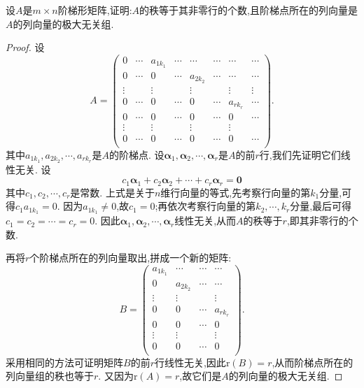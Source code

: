 \documentclass[../../main.tex]{subfiles}%
\begin{document}
\begin{proposition}\label{proposition:阶梯形矩阵的非零行对应其列向量的极大无关组}
设\(A\)是\(m\times n\)阶梯形矩阵,证明:\(A\)的秩等于其非零行的个数,且阶梯点所在的列向量是\(A\)的列向量的极大无关组.
\end{proposition}
\begin{proof}

设
\[
A=\left( \begin{matrix}
0&		\cdots&		a_{1k_1}&		\cdots&		\cdots&		\cdots&		\cdots&		\cdots\\
0&		\cdots&		0&		\cdots&		a_{2k_2}&		\cdots&		\cdots&		\cdots\\
\vdots&		&		\vdots&		&		\vdots&		&		\vdots&		\vdots\\
0&		\cdots&		0&		\cdots&		0&		\cdots&		a_{rk_r}&		\cdots\\
0&		\cdots&		0&		\cdots&		0&		\cdots&		0&		\cdots\\
\vdots&		&		\vdots&		&		\vdots&		&		\vdots&		\\
0&		\cdots&		0&		\cdots&		0&		\cdots&		0&		\cdots\\
\end{matrix} \right) .
\]
其中\(a_{1k_1},a_{2k_2},\cdots,a_{rk_r}\)是\(A\)的阶梯点. 设\(\boldsymbol{\alpha}_1,\boldsymbol{\alpha}_2,\cdots,\boldsymbol{\alpha}_r\)是\(A\)的前\(r\)行,我们先证明它们线性无关. 设
\[
c_1\boldsymbol{\alpha}_1 + c_2\boldsymbol{\alpha}_2+\cdots + c_r\boldsymbol{\alpha}_r=\boldsymbol{0}
\]
其中\(c_1,c_2,\cdots,c_r\)是常数. 上式是关于\(n\)维行向量的等式,先考察行向量的第\(k_1\)分量,可得\(c_1a_{1k_1}=0\). 因为\(a_{1k_1}\neq0\),故\(c_1 = 0\);再依次考察行向量的第\(k_2,\cdots,k_r\)分量,最后可得\(c_1 = c_2=\cdots = c_r = 0\). 因此\(\boldsymbol{\alpha}_1,\boldsymbol{\alpha}_2,\cdots,\boldsymbol{\alpha}_r\)线性无关,从而\(A\)的秩等于\(r\),即其非零行的个数.

再将\(r\)个阶梯点所在的列向量取出,拼成一个新的矩阵:
\[
B=\left( \begin{matrix}
a_{1k_1}&		\cdots&		\cdots&		\cdots\\
0&		a_{2k_2}&		\cdots&		\cdots\\
\vdots&		\vdots&		&		\vdots\\
0&		0&		\cdots&		a_{rk_r}\\
0&		0&		\cdots&		0\\
\vdots&		\vdots&		&		\vdots\\
0&		0&		\cdots&		0\\
\end{matrix} \right) .
\]
采用相同的方法可证明矩阵\(B\)的前\(r\)行线性无关,因此\(\text{r}(B)=r\),从而阶梯点所在的列向量组的秩也等于\(r\). 又因为\(\text{r}(A)=r\),故它们是\(A\)的列向量的极大无关组.

\end{proof}
\end{document}
